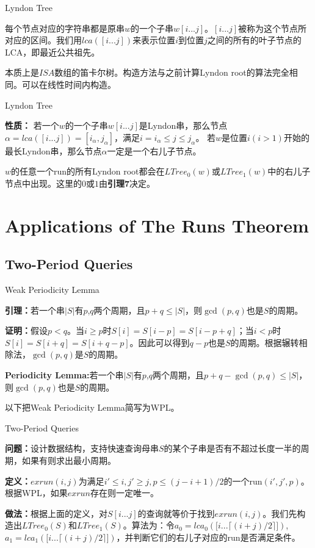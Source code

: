 \documentclass{beamer}
\begin{document}
\begin{frame}{Lyndon Tree}
	\par 每个节点对应的字符串都是原串$w$的一个子串$w[i...j]$。$[i...j]$被称为这个节点所对应的区间。我们用$lca([i...j])$来表示位置$i$到位置$j$之间的所有的叶子节点的LCA，即最近公共祖先。
	\pause
	\par 本质上是$ISA$数组的笛卡尔树。构造方法与之前计算Lyndon root的算法完全相同。可以在线性时间内构造。
\end{frame}

\begin{frame}{Lyndon Tree}
	\par \textbf{性质：} 若一个$w$的一个子串$w[i...j]$是Lyndon串，那么节点$\alpha = lca([i...j]) = [i_{\alpha}, j_{\alpha}]$，满足$i = i_{\alpha} \le j \le j_{\alpha}$。 若$w$是位置$i (i > 1)$开始的最长Lyndon串，那么节点$\alpha$一定是一个右儿子节点。
	\pause
	\par $w$的任意一个run的所有Lyndon root都会在$LTree_0(w)$或$LTree_1(w)$中的右儿子节点中出现。这里的$0$或$1$由\textbf{引理7}决定。
\end{frame}

\section{Applications of The Runs Theorem}

\subsection{Two-Period Queries}

\begin{frame}{Weak Periodicity Lemma}
	\par \textbf{引理：}若一个串$|S|$有$p$,$q$两个周期，且$p+q\le|S|$，则$\gcd(p,q)$也是$S$的周期。
	\pause
	\par \textbf{证明：}假设$p<q$。当$i\ge p$时$S[i]=S[i-p]=S[i-p+q]$；当$i<p$时$S[i]=S[i+q]=S[i+q-p]$。因此可以得到$q-p$也是$S$的周期。根据辗转相除法，$\gcd(p,q)$是$S$的周期。
	\pause
	\par \textbf{Periodicity Lemma:}若一个串$|S|$有$p$,$q$两个周期，且$p+q-\gcd(p,q)\le|S|$，则$\gcd(p,q)$也是$S$的周期。
	\pause
	\par 以下把Weak Periodicity Lemma简写为WPL。
\end{frame}

\begin{frame}{Two-Period Queries}
	\par \textbf{问题：}设计数据结构，支持快速查询母串$S$的某个子串是否有不超过长度一半的周期，如果有则求出最小周期。
	\pause
	\par \textbf{定义：}$exrun(i,j)$为满足$i'\le i,j'\ge j,p\le(j-i+1)/2$的一个run$(i',j',p)$。根据WPL，如果$exrun$存在则一定唯一。
	\pause
	\par \textbf{做法：}根据上面的定义，对$S[i...j]$的查询就等价于找到$exrun(i,j)$。我们先构造出$LTree_0(S)$和$LTree_1(S)$。算法为：令$a_0=lca_0\left(\big[i...\lceil(i+j)/2\rceil\big]\right)$,$a_1=lca_1\left(\big[i...\lceil(i+j)/2\rceil\big]\right)$，并判断它们的右儿子对应的run是否满足条件。
\end{frame}
\end{document}
